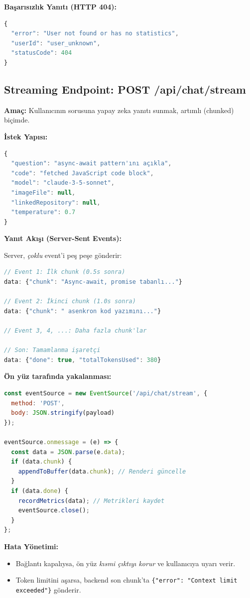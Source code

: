 \documentclass[12pt,a4paper]{article}
\begin{document}
\textbf{Başarısızlık Yanıtı (HTTP 404):}
\begin{lstlisting}[language=JavaScript]
{
  "error": "User not found or has no statistics",
  "userId": "user_unknown",
  "statusCode": 404
}
\end{lstlisting}

\subsection{Streaming Endpoint: POST /api/chat/stream}

\textbf{Amaç:} Kullanıcının sorusuna yapay zeka yanıtı sunmak, artımlı (chunked) biçimde.

\textbf{İstek Yapısı:}
\begin{lstlisting}[language=JavaScript]
{
  "question": "async-await pattern'ını açıkla",
  "code": "fetched JavaScript code block",
  "model": "claude-3-5-sonnet",
  "imageFile": null,
  "linkedRepository": null,
  "temperature": 0.7
}
\end{lstlisting}

\textbf{Yanıt Akışı (Server-Sent Events):}

Server, \textit{çoklu} event'i peş peşe gönderir:

\begin{lstlisting}[language=JavaScript, caption=SSE Olay Formatı]
// Event 1: İlk chunk (0.5s sonra)
data: {"chunk": "Async-await, promise tabanlı..."}

// Event 2: İkinci chunk (1.0s sonra)
data: {"chunk": " asenkron kod yazımını..."}

// Event 3, 4, ...: Daha fazla chunk'lar

// Son: Tamamlanma işaretçi
data: {"done": true, "totalTokensUsed": 380}
\end{lstlisting}

\textbf{Ön yüz tarafında yakalanması:}
\begin{lstlisting}[language=JavaScript]
const eventSource = new EventSource('/api/chat/stream', {
  method: 'POST',
  body: JSON.stringify(payload)
});

eventSource.onmessage = (e) => {
  const data = JSON.parse(e.data);
  if (data.chunk) {
    appendToBuffer(data.chunk); // Renderi güncelle
  }
  if (data.done) {
    recordMetrics(data); // Metrikleri kaydet
    eventSource.close();
  }
};
\end{lstlisting}

\textbf{Hata Yönetimi:}
\begin{itemize}[leftmargin=*]
  \item Bağlantı kapalıysa, ön yüz \textit{kısmi çıktıyı korur} ve kullanıcıya uyarı verir.
  \item Token limitini aşarsa, backend son chunk'ta \texttt{\{"error": "Context limit exceeded"\}} gönderir.
\end{itemize}
\end{document}
